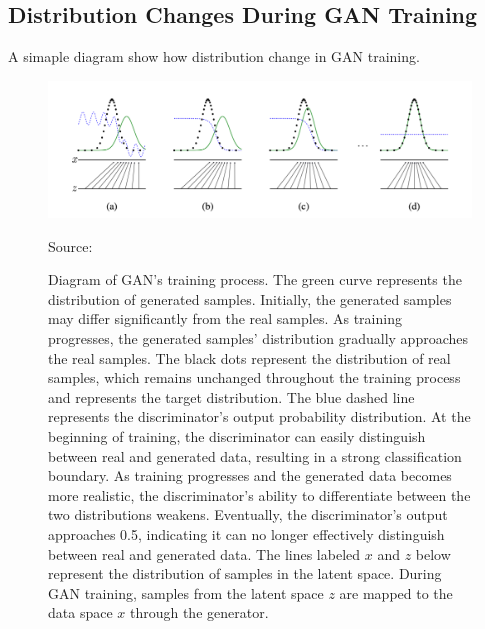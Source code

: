 \subsection{Distribution Changes During GAN Training}
A simaple diagram show how distribution change in GAN training.

\begin{figure}[h]
    \centering
    \includegraphics[width=1.2\linewidth]{./Images/data_distribution.jpg}
    \caption{ Diagram of GAN's training process. 
    The green curve represents the distribution of generated samples. Initially, the generated samples may differ significantly from the real samples. As training progresses, the generated samples' distribution gradually approaches the real samples.
    The black dots represent the distribution of real samples, which remains unchanged throughout the training process and represents the target distribution.
    The blue dashed line represents the discriminator's output probability distribution. At the beginning of training, the discriminator can easily distinguish between real and generated data, resulting in a strong classification boundary. As training progresses and the generated data becomes more realistic, the discriminator's ability to differentiate between the two distributions weakens. Eventually, the discriminator's output approaches 0.5, indicating it can no longer effectively distinguish between real and generated data.
    The lines labeled $x$ and $z$ below represent the distribution of samples in the latent space. During GAN training, samples from the latent space $z$ are mapped to the data space $x$ through the generator.
    }
    \label{fig:gan_training_process}
    \vspace{1pt} %
    \small{Source: \cite{goodfellow2014generative}}
\end{figure}

